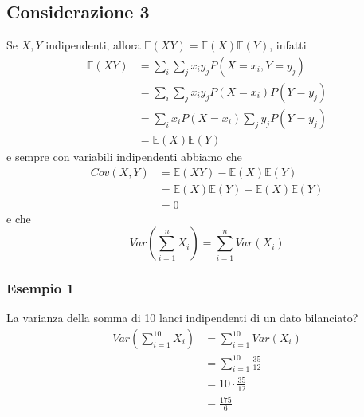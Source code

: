 \documentclass[11pt]{report}
\begin{document}
\subsection{Considerazione 3}
Se $X,Y$ indipendenti, allora $\mathbb{E}(XY) = \mathbb{E}(X)\mathbb{E}(Y)$, infatti
\begin{equation}
    \begin{split}
        \mathbb{E}(XY) & = \sum_i \sum_j x_i y_j P(X=x_i, Y=y_j)\\
        & = \sum_i \sum_j x_i y_j P(X=x_i) P(Y=y_j)\\
        & = \sum_i x_i P(X=x_i) \sum_j  y_j P(Y=y_j)\\
        & = \mathbb{E}(X)\mathbb{E}(Y)
    \end{split}
\end{equation}
e sempre con variabili indipendenti abbiamo che
\begin{equation}
    \begin{split}
        Cov(X,Y) & = \mathbb{E}(XY) - \mathbb{E}(X)\mathbb{E}(Y)\\
        & = \mathbb{E}(X)\mathbb{E}(Y) - \mathbb{E}(X)\mathbb{E}(Y)\\
        & = 0
    \end{split}
\end{equation}
e che
\begin{equation}
    Var \left( \sum_{i=1}^n X_i \right) = \sum_{i=1}^n Var(X_i)
\end{equation}
\subsubsection{Esempio 1}
La varianza della somma di 10 lanci indipendenti di un dato bilanciato?
\begin{equation}
    \begin{split}
        Var\left(\sum_{i=1}^{10} X_i\right) & = \sum_{i=1}^{10} Var(X_i)\\
        & = \sum_{i=1}^{10} \frac{35}{12}\\
        & = 10 \cdot \frac{35}{12}\\
        & = \frac{175}{6}
    \end{split}
\end{equation}
\end{document}

